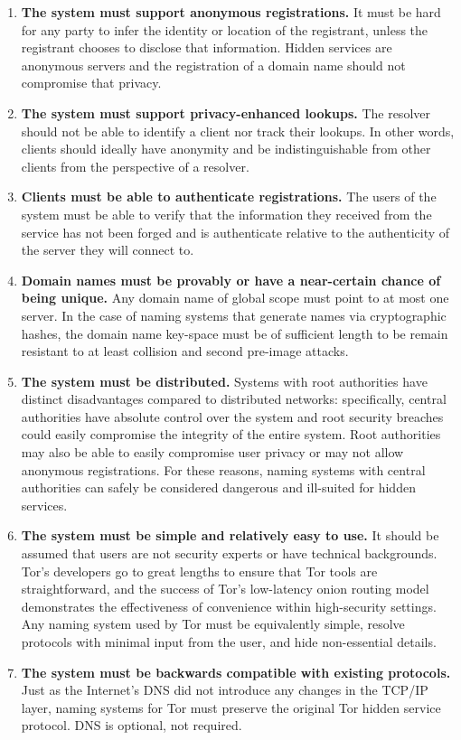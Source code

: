 \documentclass{sig-alternate}
\begin{document}
\begin{enumerate}
	\item \textbf{The system must support anonymous registrations.} It must be hard for any party to infer the identity or location of the registrant, unless the registrant chooses to disclose that information. Hidden services are anonymous servers and the registration of a domain name should not compromise that privacy.
	\item \textbf{The system must support privacy-enhanced lookups.} The resolver should not be able to identify a client nor track their lookups. In other words, clients should ideally have anonymity and be indistinguishable from other clients from the perspective of a resolver.
	\item \textbf{Clients must be able to authenticate registrations.} The users of the system must be able to verify that the information they received from the service has not been forged and is authenticate relative to the authenticity of the server they will connect to. %
	\item \textbf{Domain names must be provably or have a near-certain chance of being unique.} Any domain name of global scope must point to at most one server. In the case of naming systems that generate names via cryptographic hashes, the domain name key-space must be of sufficient length to be remain resistant to at least collision and second pre-image attacks.
	\item \textbf{The system must be distributed.} Systems with root authorities have distinct disadvantages compared to distributed networks: specifically, central authorities have absolute control over the system and root security breaches could easily compromise the integrity of the entire system. Root authorities may also be able to easily compromise user privacy or may not allow anonymous registrations. For these reasons, naming systems with central authorities can safely be considered dangerous and ill-suited for hidden services.
	\item \textbf{The system must be simple and relatively easy to use.} It should be assumed that users are not security experts or have technical backgrounds. Tor's developers go to great lengths to ensure that Tor tools are straightforward, and the success of Tor's low-latency onion routing model demonstrates the effectiveness of convenience within high-security settings. Any naming system used by Tor must be equivalently simple, resolve protocols with minimal input from the user, and hide non-essential details.
	\item \textbf{The system must be backwards compatible with existing protocols.} Just as the Internet's DNS did not introduce any changes in the TCP/IP layer, naming systems for Tor must preserve the original Tor hidden service protocol. DNS is optional, not required.
\end{enumerate}
\end{document}
